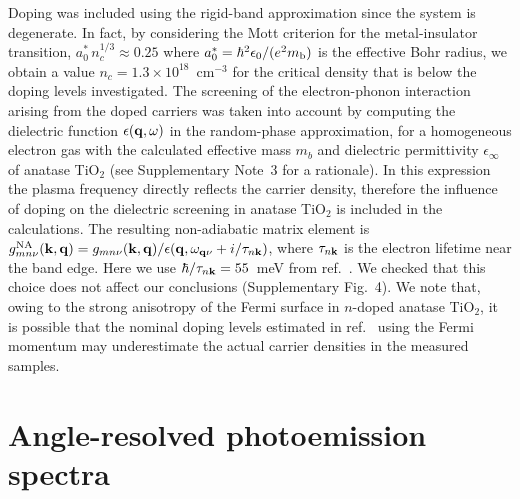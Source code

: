 \documentclass[12pt]{nature}
\def\bk{{\bf k}}
\def\bq{{\bf q}}
\begin{document}
Doping was included using the rigid-band approximation since the system is degenerate. 
In fact, by considering the Mott criterion for the metal-insulator transition\cite{Mott1990}, 
$a_0^\ast\,n_c^{1/3}\approx0.25$ where $a_0^\ast=\hbar^2\epsilon_0/(e^2 m_{\rm b})$ is the effective 
Bohr radius, we obtain a value $n_c=1.3\times10^{18}$~cm$^{-3}$ for the critical density that is below 
the doping levels investigated. The screening of the electron-phonon interaction arising from the 
doped carriers was taken into account by computing the dielectric function $\epsilon(\bq,\omega)$ in 
the random-phase approximation\cite{Mahan, Hedin1965}, for a homogeneous electron gas with the calculated 
effective mass $m_b$ and dielectric permittivity $\epsilon_\infty$ of anatase TiO$_2$\cite{Mahan, Hedin1965} 
(see Supplementary Note~3 for a rationale). In this expression the plasma frequency directly reflects 
the carrier density, therefore the influence of doping on the dielectric screening in anatase 
TiO$_2$\cite{Mardare2004} is included in the calculations. The resulting non-adiabatic matrix element 
is $g_{mn\nu}^{\rm NA}(\bk,\bq)= g_{mn\nu}(\bk,\bq)/\epsilon(\bq,\omega_{\bq\nu}+i/\tau_{n\bk})$, where 
$\tau_{n\bk}$ is the electron lifetime near the band edge. Here we use $\hbar/\tau_{n\bk} = 55$~meV 
from ref.~. We checked that this choice does not affect our conclusions (Supplementary 
Fig.~4). We note that, owing to the strong anisotropy of the Fermi surface in \mbox{$n$-doped} anatase 
TiO$_2$, it is possible that the nominal doping levels estimated in ref.~ using the 
Fermi momentum may underestimate the actual carrier densities in the measured samples.

\section*{\textsf{\small Angle-resolved photoemission spectra}} \vspace*{-10pt}
\end{document}
